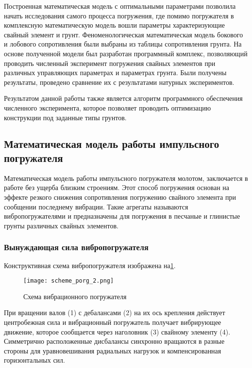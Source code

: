 Построенная математическая модель с оптимальными параметрами позволила начать исследования самого процесса погружения, где помимо погружателя в комплексную математическую модель вошли параметры характеризующие свайный элемент и грунт.
Феноменологическая математическая модель бокового и лобового сопротивления были выбраны из таблицы сопротивления грунта. На основе полученной модели был разработан программный комплекс,
позволяющий проводить численный эксперимент погружения свайных элементов при различных управляющих параметрах и параметрах грунта.
Были получены результаты, проведено сравнение их с результатами натурных экспериментов.

Результатом данной работы также является алгоритм программного обеспечения численного эксперимента, которое позволяет проводить оптимизацию конструкции под заданные типы грунтов.


\subsection{Математическая модель работы импульсного погружателя}

Математическая модель работы импульсного погружателя молотом, заключается в работе без ущерба близким строениям. Этот способ погружения основан на эффекте резкого снижения сопротивления погружению свайного элемента при сообщении последнему вибрации.
Такие агрегаты называются вибропогружателями и предназначены для погружения в песчаные и глинистые грунты различных свайных элементов.

\subsubsection{Вынуждающая сила вибропогружателя}

Конструктивная схема вибропогружателя изображена на \ref{fig:scheme_porg}.
\begin{figure}[h]
    \centering
    \texttt{[image: scheme\_porg\_2.png]}
    \caption{Схема вибрационного погружателя}
    \label{fig:scheme_porg}
\end{figure}

При вращении валов (1) с дебалансами (2) на их ось крепления действует центробежная сила и вибрационный погружатель получает вибрирующее движение,
которое сообщается через наголовник (3) свайному элементу (4). Симметрично расположенные дисбалансы синхронно вращаются в разные стороны для уравновешивания радиальных нагрузок и компенсированная горизонтальных сил.

